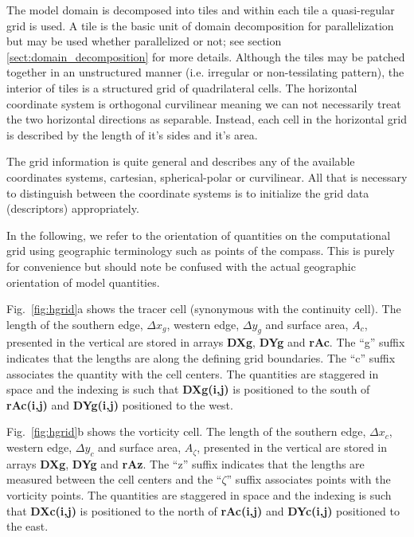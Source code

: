 The model domain is decomposed into tiles and within each tile a
quasi-regular grid is used. A tile is the basic unit of domain
decomposition for parallelization but may be used whether parallelized
or not; see section \ref{sect:domain_decomposition} for more details. 
Although the tiles may be patched together in an unstructured manner
(i.e. irregular or non-tessilating pattern), the interior of tiles is
a structured grid of quadrilateral cells. The horizontal coordinate
system is orthogonal curvilinear meaning we can not necessarily treat
the two horizontal directions as separable. Instead, each cell in the
horizontal grid is described by the length of it's sides and it's
area.

The grid information is quite general and describes any of the
available coordinates systems, cartesian, spherical-polar or
curvilinear. All that is necessary to distinguish between the
coordinate systems is to initialize the grid data (descriptors)
appropriately.

In the following, we refer to the orientation of quantities on the
computational grid using geographic terminology such as points of the
compass.
This is purely for convenience but should note be confused
with the actual geographic orientation of model quantities.

Fig.~\ref{fig:hgrid}a shows the tracer cell (synonymous with the
continuity cell). The length of the southern edge, $\Delta x_g$,
western edge, $\Delta y_g$ and surface area, $A_c$, presented in the
vertical are stored in arrays {\bf DXg}, {\bf DYg} and {\bf rAc}.
The ``g'' suffix indicates that the lengths are along the defining
grid boundaries. The ``c'' suffix associates the quantity with the
cell centers. The quantities are staggered in space and the indexing
is such that {\bf DXg(i,j)} is positioned to the south of {\bf
rAc(i,j)} and {\bf DYg(i,j)} positioned to the west.

Fig.~\ref{fig:hgrid}b shows the vorticity cell. The length of the
southern edge, $\Delta x_c$, western edge, $\Delta y_c$ and surface
area, $A_\zeta$, presented in the vertical are stored in arrays {\bf
DXg}, {\bf DYg} and {\bf rAz}.
The ``z'' suffix indicates that the lengths are measured between the
cell centers and the ``$\zeta$'' suffix associates points with the
vorticity points. The quantities are staggered in space and the
indexing is such that {\bf DXc(i,j)} is positioned to the north of
{\bf rAc(i,j)} and {\bf DYc(i,j)} positioned to the east.

